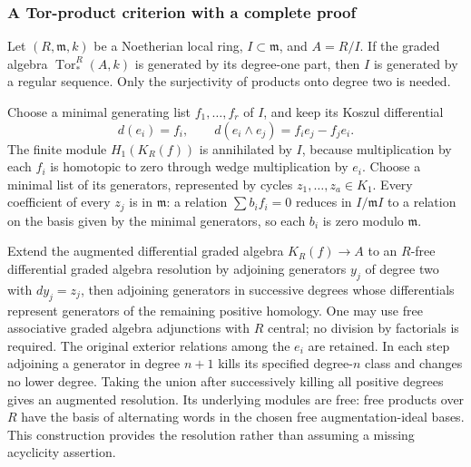 \subsubsection{A Tor-product criterion with a complete proof}\label{algebra-proof-045-a-tor-product-criterion-with-a-complete-proof}

Let \((R,\mathfrak m,k)\) be a Noetherian local ring, \(I\subset\mathfrak m\), and \(A=R/I\). If the graded algebra \(\operatorname{Tor}^R_*(A,k)\) is generated by its degree-one part, then \(I\) is generated by a regular sequence. Only the surjectivity of products onto degree two is needed.

Choose a minimal generating list \(f_1,\ldots,f_r\) of \(I\), and keep its Koszul differential \[
d(e_i)=f_i,\qquad d(e_i\wedge e_j)=f_i e_j-f_j e_i.
\] The finite module \(H_1(K_R(f))\) is annihilated by \(I\), because multiplication by each \(f_i\) is homotopic to zero through wedge multiplication by \(e_i\). Choose a minimal list of its generators, represented by cycles \(z_1,\ldots,z_a\in K_1\). Every coefficient of every \(z_j\) is in \(\mathfrak m\): a relation \(\sum b_i f_i=0\) reduces in \(I/\mathfrak mI\) to a relation on the basis given by the minimal generators, so each \(b_i\) is zero modulo \(\mathfrak m\).

Extend the augmented differential graded algebra \(K_R(f)\to A\) to an \(R\)-free differential graded algebra resolution by adjoining generators \(y_j\) of degree two with \(dy_j=z_j\), then adjoining generators in successive degrees whose differentials represent generators of the remaining positive homology. One may use free associative graded algebra adjunctions with \(R\) central; no division by factorials is required. The original exterior relations among the \(e_i\) are retained. In each step adjoining a generator in degree \(n+1\) kills its specified degree-\(n\) class and changes no lower degree. Taking the union after successively killing all positive degrees gives an augmented resolution. Its underlying modules are free: free products over \(R\) have the basis of alternating words in the chosen free augmentation-ideal bases. This construction provides the resolution rather than assuming a missing acyclicity assertion.

